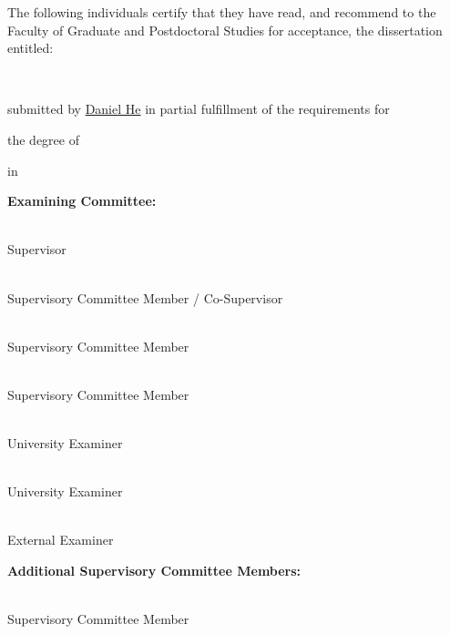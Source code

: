 \documentclass[
]{article}
\begin{document}
\doublespacing

The following individuals certify that they have read, and recommend to the Faculty of Graduate
and Postdoctoral Studies for acceptance, the dissertation entitled:

\vspace{5mm}

\noindent\underline{}\\
\vspace{2mm}

submitted by \underline{Daniel He} in partial fulfillment of the requirements for

the degree of \noindent\underline{}

in \noindent\underline{}

\vspace{5mm}

\textbf{Examining Committee:}

\noindent\underline{}\\
Supervisor

\noindent\underline{}\\
Supervisory Committee Member / Co-Supervisor

\noindent\underline{}\\
Supervisory Committee Member

\noindent\underline{}\\
Supervisory Committee Member

\noindent\underline{}\\
University Examiner

\noindent\underline{}\\
University Examiner

\noindent\underline{}\\
External Examiner

\textbf{Additional Supervisory Committee Members:}

\noindent\underline{}\\
Supervisory Committee Member

\clearpage
\end{document}
